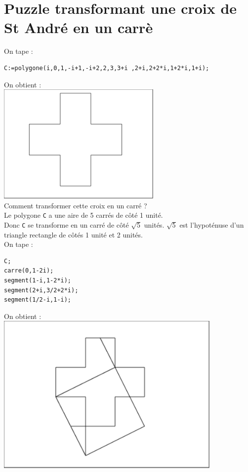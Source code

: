 \documentclass[a4paper,11pt]{book}
\begin{document}
\section{Puzzle transformant une croix de St Andr\'e en un carr\`e}
On tape :
\begin{verbatim}
C:=polygone(i,0,1,-i+1,-i+2,2,3,3+i ,2+i,2+2*i,1+2*i,1+i);
\end{verbatim}
On obtient :\\
\includegraphics[width=8cm]{puzzlecroix0}\\
Comment transformer cette croix en un carr\'e ?\\
Le polygone {\tt C} a une aire de 5 carr\'es de c\^ot\'e 1 unit\'e.\\
Donc {\tt C} se transforme en un carr\'e de c\^ot\'e $\sqrt 5$ unit\'es.
$\sqrt 5$ est l'hypot\'enuse d'un triangle rectangle de c\^ot\'es 1 unit\'e
et 2 unit\'es.\\
On tape :
\begin{verbatim}
C;
carre(0,1-2i);
segment(1-i,1-2*i);
segment(2+i,3/2+2*i);
segment(1/2-i,1-i);
\end{verbatim}
On obtient :\\
\includegraphics[width=11cm]{puzzlecroix1}\\
\end{document}

